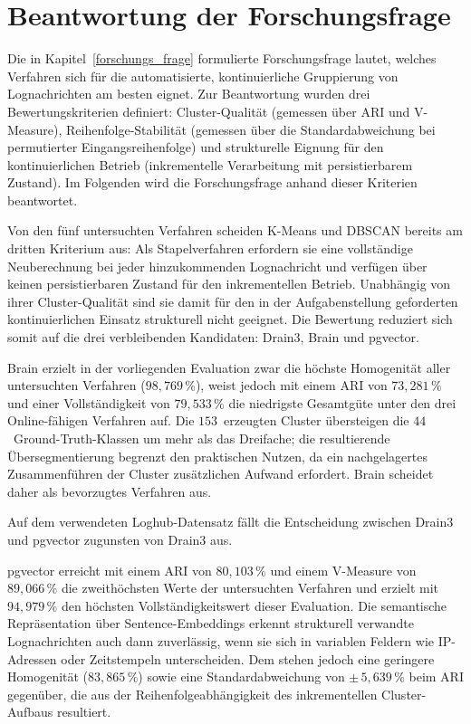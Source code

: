 \section{Beantwortung der Forschungsfrage}
\label{sec:abschluss:forschungsfrage}

Die in Kapitel~\ref{forschungs_frage} formulierte Forschungsfrage lautet, welches Verfahren sich für die automatisierte, kontinuierliche Gruppierung von Lognachrichten am besten eignet. Zur Beantwortung wurden drei Bewertungskriterien definiert: Cluster-Qualität (gemessen über ARI und V-Measure), Reihenfolge-Stabilität (gemessen über die Standardabweichung bei permutierter Eingangsreihenfolge) und strukturelle Eignung für den kontinuierlichen Betrieb (inkrementelle Verarbeitung mit persistierbarem Zustand). Im Folgenden wird die Forschungsfrage anhand dieser Kriterien beantwortet.

Von den fünf untersuchten Verfahren scheiden K-Means und DBSCAN bereits am dritten Kriterium aus: Als Stapelverfahren erfordern sie eine vollständige Neuberechnung bei jeder hinzukommenden Lognachricht und verfügen über keinen persistierbaren Zustand für den inkrementellen Betrieb. Unabhängig von ihrer Cluster-Qualität sind sie damit für den in der Aufgabenstellung geforderten kontinuierlichen Einsatz strukturell nicht geeignet. Die Bewertung reduziert sich somit auf die drei verbleibenden Kandidaten: Drain3, Brain und pgvector.

Brain erzielt in der vorliegenden Evaluation zwar die höchste Homogenität aller untersuchten Verfahren ($98{,}769\,\%$), weist jedoch mit einem ARI von $73{,}281\,\%$ und einer Vollständigkeit von $79{,}533\,\%$ die niedrigste Gesamtgüte unter den drei Online-fähigen Verfahren auf. Die $153$~erzeugten Cluster übersteigen die $44$~Ground-Truth-Klassen um mehr als das Dreifache; die resultierende Übersegmentierung begrenzt den praktischen Nutzen, da ein nachgelagertes Zusammenführen der Cluster zusätzlichen Aufwand erfordert. Brain scheidet daher als bevorzugtes Verfahren aus.

Auf dem verwendeten Loghub-Datensatz fällt die Entscheidung zwischen Drain3 und pgvector zugunsten von Drain3 aus.

pgvector erreicht mit einem ARI von $80{,}103\,\%$ und einem V-Measure von $89{,}066\,\%$ die zweithöchsten Werte der untersuchten Verfahren und erzielt mit $94{,}979\,\%$ den höchsten Vollständigkeitswert dieser Evaluation. Die semantische Repräsentation über Sentence-Embeddings erkennt strukturell verwandte Lognachrichten auch dann zuverlässig, wenn sie sich in variablen Feldern wie IP-Adressen oder Zeitstempeln unterscheiden. Dem stehen jedoch eine geringere Homogenität ($83{,}865\,\%$) sowie eine Standardabweichung von $\pm\,5{,}639\,\%$ beim ARI gegenüber, die aus der Reihenfolgeabhängigkeit des inkrementellen Cluster-Aufbaus resultiert.

